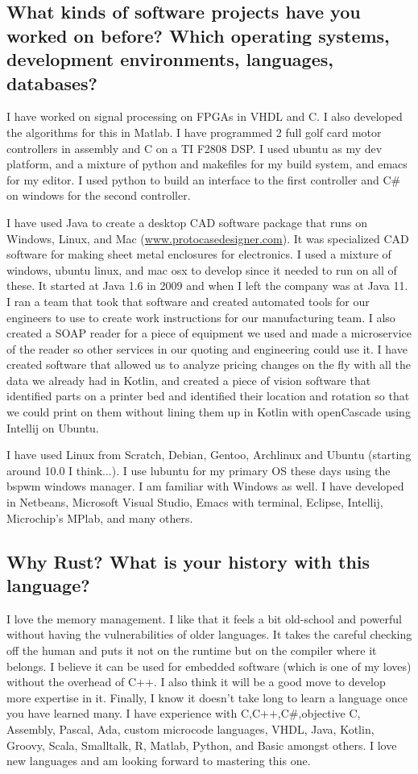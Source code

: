 \documentclass[letter,12pt]{article}
\begin{document}
\subsection{What kinds of software projects have you worked on before? Which operating systems, development environments, languages, databases?}
I have worked on signal processing on FPGAs in VHDL and C. I also developed the algorithms for this in Matlab. I have programmed 2 full golf card motor controllers in assembly and C on a TI F2808 DSP. I used ubuntu as my dev platform, and a mixture of python and makefiles for my build system, and emacs for my editor. I used python to build an interface to the first controller and C\# on windows for the second controller.

I have used Java to create a desktop CAD software package that runs on Windows, Linux, and Mac (\href{http://www.protocasedesigner.com}{www.protocasedesigner.com}). It was specialized CAD software for making sheet metal enclosures for electronics. I used a mixture of windows, ubuntu linux, and mac osx to develop since it needed to run on all of these. It started at Java 1.6 in 2009 and when I left the company was at Java 11. I ran a team that took that software and created automated tools for our engineers to use to create work instructions for our manufacturing team. I also created a SOAP reader for a piece of equipment we used and made a microservice of the reader so other services in our quoting and engineering could use it. I have created software that allowed us to analyze pricing changes on the fly with all the data we already had in Kotlin, and created a piece of vision software that identified parts on a printer bed and identified their location and rotation so that we could print on them without lining them up in Kotlin with openCascade using Intellij on Ubuntu.

I have used Linux from Scratch, Debian, Gentoo, Archlinux and Ubuntu (starting around 10.0 I think...). I use lubuntu for my primary OS these days using the bspwm windows manager. I am familiar with Windows as well. I have developed in Netbeans, Microsoft Visual Studio, Emacs with terminal, Eclipse, Intellij, Microchip's MPlab, and many others.

\subsection{Why Rust? What is your history with this language?}
I love the memory management. I like that it feels a bit old-school and powerful without having the vulnerabilities of older languages. It takes the careful checking off the human and puts it not on the runtime but on the compiler where it belongs. I believe it can be used for embedded software (which is one of my loves) without the overhead of C++. I also think it will be a good move to develop more expertise in it. Finally, I know it doesn't take long to learn a language once you have learned many. I have experience with C,C++,C\#,objective C, Assembly, Pascal, Ada, custom microcode languages, VHDL, Java, Kotlin, Groovy, Scala, Smalltalk, R, Matlab, Python, and Basic amongst others. I love new languages and am looking forward to mastering this one.
\end{document}
